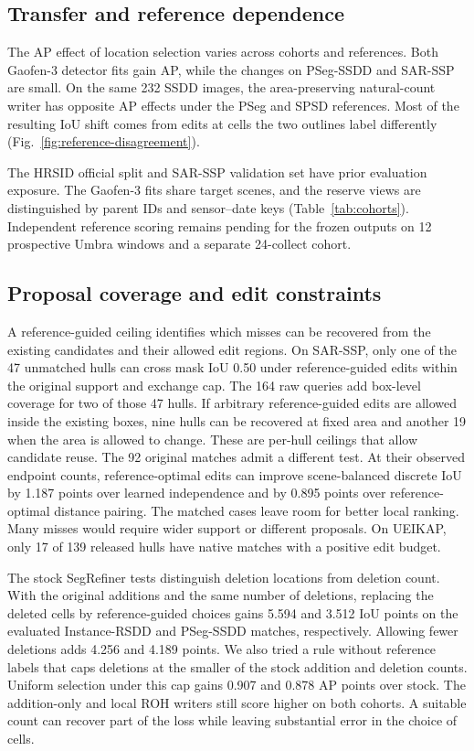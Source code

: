 \documentclass[journal]{IEEEtran}
\begin{document}
\subsection{Transfer and reference dependence}
The AP effect of location selection varies across cohorts and references. Both Gaofen-3 detector fits gain AP, while the changes on PSeg-SSDD and SAR-SSP are small. On the same 232 SSDD images, the area-preserving natural-count writer has opposite AP effects under the PSeg and SPSD references. Most of the resulting IoU shift comes from edits at cells the two outlines label differently (Fig.~\ref{fig:reference-disagreement}).

The HRSID official split and SAR-SSP validation set have prior evaluation exposure. The Gaofen-3 fits share target scenes, and the reserve views are distinguished by parent IDs and sensor--date keys (Table~\ref{tab:cohorts}). Independent reference scoring remains pending for the frozen outputs on 12 prospective Umbra windows and a separate 24-collect cohort.

\subsection{Proposal coverage and edit constraints}
A reference-guided ceiling identifies which misses can be recovered from the existing candidates and their allowed edit regions. On SAR-SSP, only one of the 47 unmatched hulls can cross mask IoU 0.50 under reference-guided edits within the original support and exchange cap. The 164 raw queries add box-level coverage for two of those 47 hulls. If arbitrary reference-guided edits are allowed inside the existing boxes, nine hulls can be recovered at fixed area and another 19 when the area is allowed to change. These are per-hull ceilings that allow candidate reuse. The 92 original matches admit a different test. At their observed endpoint counts, reference-optimal edits can improve scene-balanced discrete IoU by 1.187 points over learned independence and by 0.895 points over reference-optimal distance pairing. The matched cases leave room for better local ranking. Many misses would require wider support or different proposals. On UEIKAP, only 17 of 139 released hulls have native matches with a positive edit budget.

The stock SegRefiner tests distinguish deletion locations from deletion count. With the original additions and the same number of deletions, replacing the deleted cells by reference-guided choices gains 5.594 and 3.512 IoU points on the evaluated Instance-RSDD and PSeg-SSDD matches, respectively. Allowing fewer deletions adds 4.256 and 4.189 points. We also tried a rule without reference labels that caps deletions at the smaller of the stock addition and deletion counts. Uniform selection under this cap gains 0.907 and 0.878 AP points over stock. The addition-only and local ROH writers still score higher on both cohorts. A suitable count can recover part of the loss while leaving substantial error in the choice of cells.
\end{document}

